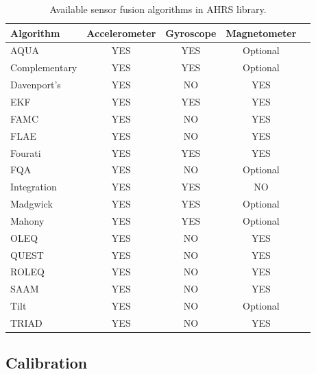 \begin{table}
  \begin{center}
    \begin{tabular}[t]{lcccc}
      \hline
      Algorithm     & Accelerometer & Gyroscope & Magnetometer \\
      \hline
      AQUA          & YES           & YES       & Optional     \\
      Complementary & YES           & YES       & Optional     \\
      Davenport's   & YES           & NO        & YES          \\
      EKF           & YES           & YES       & YES          \\
      FAMC          & YES           & NO        & YES          \\
      FLAE          & YES           & NO        & YES          \\
      Fourati       & YES           & YES       & YES          \\
      FQA           & YES           & NO        & Optional     \\
      Integration   & YES           & YES       & NO           \\
      Madgwick      & YES           & YES       & Optional     \\
      Mahony        & YES           & YES       & Optional     \\
      OLEQ          & YES           & NO        & YES          \\
      QUEST         & YES           & NO        & YES          \\
      ROLEQ         & YES           & NO        & YES          \\
      SAAM          & YES           & NO        & YES          \\
      Tilt          & YES           & NO        & Optional     \\
      TRIAD         & YES           & NO        & YES          \\
      \hline
    \end{tabular}
    \caption{Available sensor fusion algorithms in AHRS library. }
    \label{tab:ahrs_algorithms}
  \end{center}
\end{table}

\subsection{Calibration}

